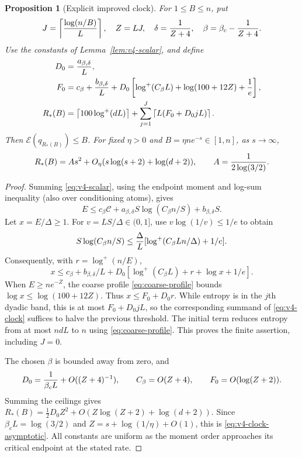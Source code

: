 \documentclass[11pt]{article}
\numberwithin{equation}{section}
\newtheorem{proposition}[theorem]{Proposition}
\theoremstyle{definition}\newtheorem{definition}[theorem]{Definition}
\theoremstyle{remark}\newtheorem{remark}[theorem]{Remark}
\newcommand{\Ent}{\mathcal E}
\begin{document}
\begin{proposition}[Explicit improved clock]\label{prop:v4-clock}
For $1\le B\le n$, put
\[
 J=\left\lceil{\log(n/B)\over L}\right\rceil,\quad Z=LJ,\quad
 \delta={1\over Z+4},\quad \beta=\beta_c-{1\over Z+4}.
\]
Use the constants of Lemma~\ref{lem:v4-scalar}, and define
\begin{align}
 D_0&={a_{\beta,\delta}\over L},\nonumber\\
 F_0&=c_\beta+{b_{\beta,\delta}\over L}
   +D_0\left[\log^+(C_\beta L)+\log(100+12Z)+{1\over e}\right],\nonumber\\
 R_*(B)&=\left\lceil100\log^+(dL)\right\rceil
       +\sum_{j=1}^J\left\lceil L(F_0+D_0jL)\right\rceil.
 \label{eq:v4-clock}
\end{align}
Then $\Ent(q_{R_*(B)})\le B$. For fixed $\eta>0$ and
$B=\eta ne^{-s}\in[1,n]$, as $s\to\infty$,
\begin{equation}\label{eq:v4-clock-asymptotic}
 R_*(B)=A s^2+O_\eta(s\log(s+2)+\log(d+2)),
 \qquad A={1\over2\log(3/2)}.
\end{equation}
\end{proposition}
\begin{proof}
Summing \eqref{eq:v4-scalar}, using the endpoint moment and log-sum
inequality (also over conditioning atoms), gives
\[
 E\le c_\beta\mathcal C+
 a_{\beta,\delta}S\log(C_\beta n/S)+b_{\beta,\delta}S.
\]
Let $x=E/\Delta\ge1$. For $v=LS/\Delta\in(0,1]$, use
$v\log(1/v)\le1/e$ to obtain
\[
 S\log(C_\beta n/S)
 \le{\Delta\over L}[\log^+(C_\beta Ln/\Delta)+1/e].
\]
Consequently, with $r=\log^+(n/E)$,
\[
 x\le c_\beta+b_{\beta,\delta}/L+
 D_0[\log^+(C_\beta L)+r+\log x+1/e].
\]
When $E\ge ne^{-Z}$, the coarse profile
\eqref{eq:coarse-profile} bounds $\log x\le\log(100+12Z)$. Thus
$x\le F_0+D_0r$. While entropy is in the $j$th dyadic band, this is at
most $F_0+D_0jL$, so the corresponding summand of \eqref{eq:v4-clock}
suffices to halve the previous threshold. The initial term reduces entropy
from at most $ndL$ to $n$ using \eqref{eq:coarse-profile}. This proves
the finite assertion, including $J=0$.

The chosen $\beta$ is bounded away from zero, and
\[
 D_0={1\over\beta_c L}+O((Z+4)^{-1}),\qquad
 C_\beta=O(Z+4),\qquad F_0=O(\log(Z+2)).
\]
Summing the ceilings gives
$R_*(B)=\frac12D_0Z^2+O(Z\log(Z+2)+\log(d+2))$.
Since $\beta_cL=\log(3/2)$ and $Z=s+\log(1/\eta)+O(1)$, this is
\eqref{eq:v4-clock-asymptotic}. All constants are uniform as the moment
order approaches its critical endpoint at the stated rate.
\end{proof}
\end{document}
